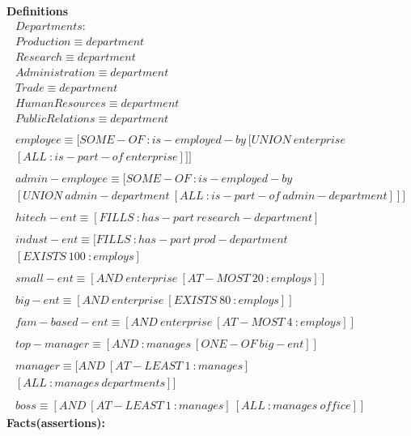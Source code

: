 \documentclass[11pt]{article}
\begin{document}
\textbf{Definitions}
\begin{align*}
Departments: \\
Production \equiv department \\ 
Research \equiv department \\
Administration \equiv department \\
Trade \equiv department \\
HumanResources \equiv department \\
PublicRelations \equiv department \\
\\
employee \equiv [SOME-OF\ :is-employed-by\ [UNION\ enterprise\\ 
[ALL\ :is-part-of\ enterprise]]] \\
\\
admin-employee \equiv [SOME-OF\ :is-employed-by\\
[UNION\ admin-department\ [ALL\ :is-part-of\ admin-department]]] \\ 
\\
hitech-ent \equiv [FILLS\ :has-part\ research-department] \\ 
\\
indust-ent \equiv [FILLS\ :has-part\ prod-department\\ 
[EXISTS\ 100\ :employs] \\
\\
small-ent \equiv [AND\ enterprise\ [AT-MOST\ 20\ :employs]] \\
\\
big-ent \equiv [AND\ enterprise\ [EXISTS\ 80\ :employs]] \\
\\
fam-based-ent \equiv [AND\ enterprise\ [AT-MOST\ 4\ :employs]] \\
\\
top-manager \equiv [AND\ :manages\ [ONE-OF\ big-ent]] \\ 
\\
manager \equiv [AND\ [AT-LEAST\ 1\ :manages]\\ [ALL\ :manages\ departments]] \\ 
\\
boss \equiv [AND\ [AT-LEAST\ 1\ :manages]\ [ALL\ :manages\ office]] 
\end{align*}
\textbf{Facts(assertions):}
\end{document}
